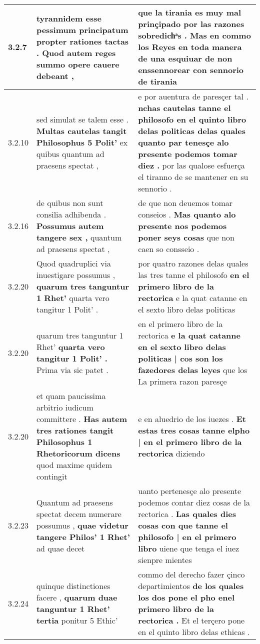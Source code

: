 \begin{tabular}{|p{1cm}|p{6.5cm}|p{6.5cm}|}
3.2.7 & tyrannidem esse pessimum principatum \textbf{ propter rationes tactas . } Quod autem reges summo opere cauere debeant , & que la tirania es muy mal prinçipado \textbf{ por las razones sobredichͣs . } Mas en commo los Reyes en toda manera de una esquiuar de non enssennorear con sennorio de tirania \\\hline
3.2.10 & sed simulat se talem esse . \textbf{ Multas cautelas tangit Philosophus 5 Polit’ } ex quibus quantum ad praesens spectat , & e por auentura de paresçer tal . \textbf{ nchas cautelas tanne el philosofo en el quinto libro delas politicas delas quales quanto par tenesçe alo presente podemos tomar diez . } por las qualose esfuerça el tiranno de se mantener en su sennorio . \\\hline
3.2.16 & de quibus non sunt consilia adhibenda . \textbf{ Possumus autem tangere sex , } quantum ad praesens spectat , & de que non deuemos tomar conseios . \textbf{ Mas quanto alo presente nos podemos poner seys cosas } que non caen so consseio . \\\hline
3.2.20 & Quod quadruplici via inuestigare possumus , \textbf{ quarum tres tanguntur 1 Rhet’ } quarta vero tangitur 1 Polit’ . & por quatro razones delas quales las tres tanne el philosofo \textbf{ en el primero libro de la rectorica } e la quat catanne en el sexto libro delas politicas \\\hline
3.2.20 & quarum tres tanguntur 1 Rhet’ \textbf{ quarta vero tangitur 1 Polit’ . } Prima via sic patet . & en el primero libro de la rectorica \textbf{ e la quat catanne en el sexto libro delas politicas | cos son los fazedores delas leyes } que los La primera razon paresçe \\\hline
3.2.20 & et quam paucissima arbitrio iudicum committere . \textbf{ Has autem tres rationes tangit Philosophus 1 Rhetoricorum dicens } quod maxime quidem contingit & e en aluedrio de los iuezes . \textbf{ Et estas tres cosas tanne elpho | en el primero libro de la rectorica } diziendo \\\hline
3.2.23 & Quantum ad praesens spectat decem numerare possumus , \textbf{ quae videtur tangere Philos’ 1 Rhet’ } ad quae decet & uanto pertenesçe alo presente podemos contar diez cosas de la rectorica . \textbf{ Las quales dies cosas con que tanne el philosofo | en el primero libro } uiene que tenga el iuez sienpre mientes \\\hline
3.2.24 & quinque distinctiones facere , \textbf{ quarum duae tanguntur 1 Rhet’ tertia } ponitur 5 Ethic’ & commo del derecho fazer çinco departimientos \textbf{ de los quales los dos pone el pho enel primero libro de la rectorica . } Et el terçero pone en el quinto libro delas ethicas . \\\hline

\end{tabular}
